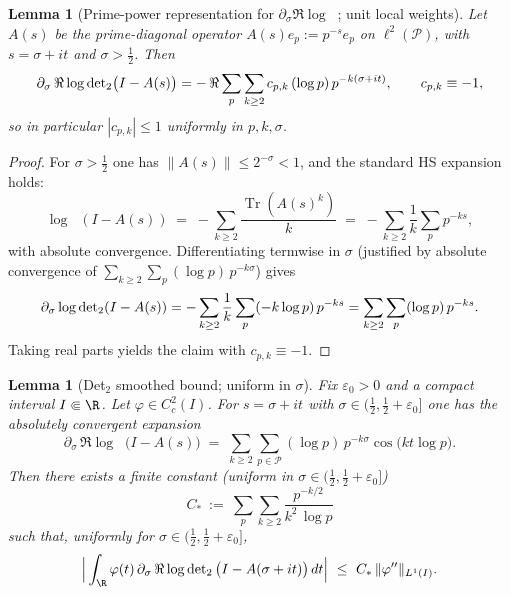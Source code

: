 \documentclass[11pt]{article}
\newtheorem{lemma}[theorem]{Lemma}
\theoremstyle{remark}
\newcommand{\PP}{\mathcal{P}}
\DeclareMathOperator{\Tr}{Tr}
\DeclareMathOperator{\dettwo}{det_2}
\begin{document}
\begin{lemma}[Prime-power representation for \(\partial_\sigma\Re\log\dettwo\); unit local weights]\label{lem:pp-rep-det2}
Let \(A(s)\) be the prime-diagonal operator \(A(s)e_p:=p^{-s}e_p\) on \(\ell^2(\PP)\), with \(s=\sigma+it\) and \(\sigma>\tfrac12\). Then
\[
  \partial_\sigma\,\Re\log\dettwo\!\big(I-A(s)\big)
  \\= -\,\Re\sum_{p}\sum_{k\ge 2} c_{p,k}\,(\log p)\,p^{-k(\sigma+it)},\qquad c_{p,k}\equiv -1,
\]
so in particular \(|c_{p,k}|\le 1\) uniformly in \(p,k,\sigma\).
\end{lemma}
\begin{proof}
For \(\sigma>\tfrac12\) one has \(\|A(s)\|\le 2^{-\sigma}<1\), and the standard HS expansion holds:
\[
  \log\dettwo(I-A(s))\;=\;-\sum_{k\ge 2} \frac{\Tr(A(s)^k)}{k}\;=\;-\sum_{k\ge 2}\frac1k\sum_{p}p^{-ks},
\]
with absolute convergence. Differentiating termwise in \(\sigma\) (justified by absolute convergence of \(\sum_{k\ge 2}\sum_p (\log p)\,p^{-k\sigma}\)) gives
\[
  \partial_\sigma \log\dettwo(I-A(s))
  \\= -\sum_{k\ge 2}\frac1k\sum_p (-k\log p)\,p^{-ks}
  \\=\sum_{k\ge 2}\sum_p (\log p)\,p^{-ks}.
\]
Taking real parts yields the claim with \(c_{p,k}\equiv -1\).
\end{proof}

\begin{lemma}[Det$_2$ smoothed bound; uniform in \(\sigma\)]\label{lem:det2-smoothed-target}
Fix \(\varepsilon_0>0\) and a compact interval \(I\Subset\R\). Let \(\varphi\in C_c^2(I)\). For \(s=\sigma+it\) with \(\sigma\in(\tfrac12,\tfrac12+\varepsilon_0]\) one has the absolutely convergent expansion
\[
 \partial_\sigma\,\Re\log\dettwo\big(I-A(s)\big)
 \;=\; \sum_{k\ge 2}\sum_{p\in\PP} (\log p)\,p^{-k\sigma}\cos\big(k t\log p\big).
\]
Then there exists a finite constant (uniform in \(\sigma\in(\tfrac12,\tfrac12+\varepsilon_0]\))
\[
 C_*\ :=\ \sum_{p}\sum_{k\ge 2}\frac{p^{-k/2}}{k^2\,\log p}
\]
such that, uniformly for \(\sigma\in(\tfrac12,\tfrac12+\varepsilon_0]\),
\[
 \Big|\int_{\R} \varphi(t)\,\partial_\sigma\,\Re\log\dettwo\big(I-A(\sigma+it)\big)\,dt\Big|
 \ \le\ C_*\,\|\varphi''\|_{L^1(I)}.
\]
\end{lemma}
\end{document}
